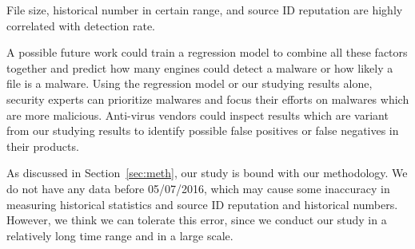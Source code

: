 File size, historical number in certain range, and source ID reputation
are highly correlated with detection rate. 

A possible future work could train a regression model to combine all these factors together and 
predict how many engines could detect a malware or how likely a file is a malware. 
Using the regression model or our studying results alone, 
security experts can prioritize malwares and focus their efforts on malwares which are more malicious. 
Anti-virus vendors could inspect results which are variant from our studying results 
to identify possible false positives or false negatives in their products. 

As discussed in Section~\ref{sec:meth}, our study is bound with our methodology.
We do not have any data before 05/07/2016, 
which may cause some inaccuracy in measuring historical statistics and 
source ID reputation and historical numbers.
However, we think we can tolerate this error, 
since we conduct our study in a relatively long time range and in a large scale. 
